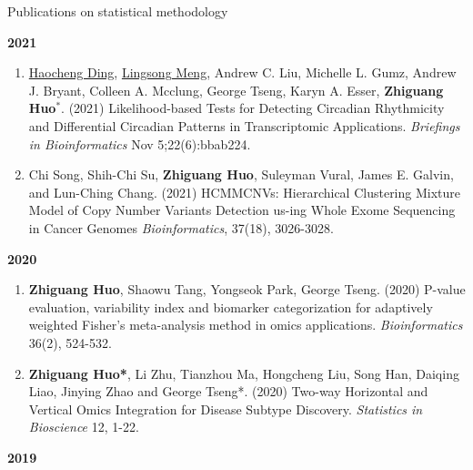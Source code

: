 \documentclass{resume} %
\begin{document}
\begin{rSection}{Publications on statistical methodology}
\begin{enumerate}[noitemsep,topsep=0pt, resume]
\label{genstat_16} 
\label{soft_9} 
\label{mlmethod_8}


\end{enumerate}


\textbf{2021}
\begin{enumerate}[noitemsep,topsep=0pt, resume]

\item
\underline{Haocheng Ding}, \underline{Lingsong Meng}, Andrew C. Liu, Michelle L. Gumz, Andrew J. Bryant, Colleen A. Mcclung, George Tseng, Karyn A. Esser, {\bf Zhiguang Huo}$^*$.  (2021)
Likelihood-based Tests for Detecting Circadian Rhythmicity and Differential Circadian Patterns in Transcriptomic Applications. 
\emph{Briefings in Bioinformatics} Nov 5;22(6):bbab224.

\label{genstat_15} 
\label{soft_8} 

\item  
Chi Song, Shih-Chi Su, {\bf Zhiguang Huo}, Suleyman Vural, James E. Galvin, and Lun-Ching Chang. (2021) 
HCMMCNVs: Hierarchical Clustering Mixture Model of Copy Number Variants Detection us-ing Whole Exome Sequencing in Cancer Genomes
\emph{Bioinformatics}, 37(18), 3026-3028.

\label{genstat_14} 
\label{shiny_3} 

\end{enumerate}

\textbf{2020}
\begin{enumerate}[noitemsep,topsep=0pt, resume]

\item  {\bf  Zhiguang Huo}, Shaowu Tang, Yongseok Park, George Tseng. (2020) 
P-value evaluation, variability index and biomarker categorization for adaptively weighted Fisher's meta-analysis method in omics applications. 
\emph{Bioinformatics} 36(2), 524-532.

\label{genstat_13} 
\label{soft_7} 


\item {\bf  Zhiguang Huo*}, Li Zhu, Tianzhou Ma, Hongcheng Liu, Song Han, Daiqing Liao, Jinying Zhao and George Tseng*.  (2020)
Two-way Horizontal and Vertical Omics Integration for Disease Subtype Discovery. \emph{Statistics in Bioscience} 12, 1-22.

\label{genstat_12} 
\label{mlmethod_7}
\label{soft_6} 

\end{enumerate}

\textbf{2019}
\begin{enumerate}[noitemsep,topsep=0pt,resume]


\end{enumerate}
\end{rSection}
\end{document}
